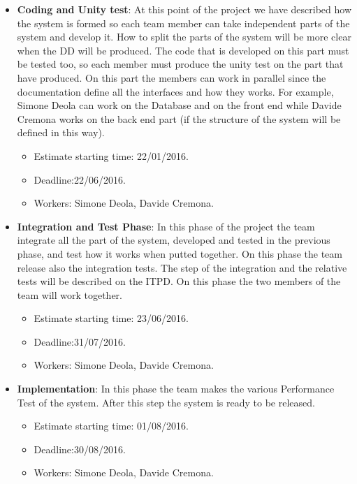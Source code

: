 \documentclass[../../projectPlan.tex]{subfiles}
\begin{document}
\begin{itemize}
		\item \textbf{Coding and Unity test}: At this point of the project we have described how the system is formed so each team member can take independent parts of the system and develop it. How to split the parts of the system will be more clear when the DD will be produced. The code that is developed on this part must be tested too, so each member must produce the unity test on the part that have produced. On this part the members can work in parallel since the documentation define all the interfaces and how they works. For example, Simone Deola can work on the Database and on the front end while Davide Cremona works on the back end part (if the structure of the system will be defined in this way).
		\begin{itemize}
		\item Estimate starting time: 22/01/2016.
		\item Deadline:22/06/2016.
		\item Workers: Simone Deola, Davide Cremona.
		\end{itemize}
		
		
		\item \textbf{Integration and Test Phase}: In this phase of the project the team integrate all the part of the system, developed and tested in the previous phase, and test how it works when putted together. On this phase the team release also the integration tests. The step of the integration and the relative tests will be described on the ITPD. On this phase the two members of the team will work together.
		\begin{itemize}
		\item Estimate starting time: 23/06/2016.
		\item Deadline:31/07/2016.
		\item Workers: Simone Deola, Davide Cremona.
		\end{itemize}
		
		\item \textbf{Implementation}: In this phase the team makes the various Performance Test of the system. After this step the system is ready to be released.
		\begin{itemize}
		\item Estimate starting time: 01/08/2016.
		\item Deadline:30/08/2016.
		\item Workers: Simone Deola, Davide Cremona.
		\end{itemize}
		
		
		
		
		\end{itemize}
		 
		

		
\end{document}
